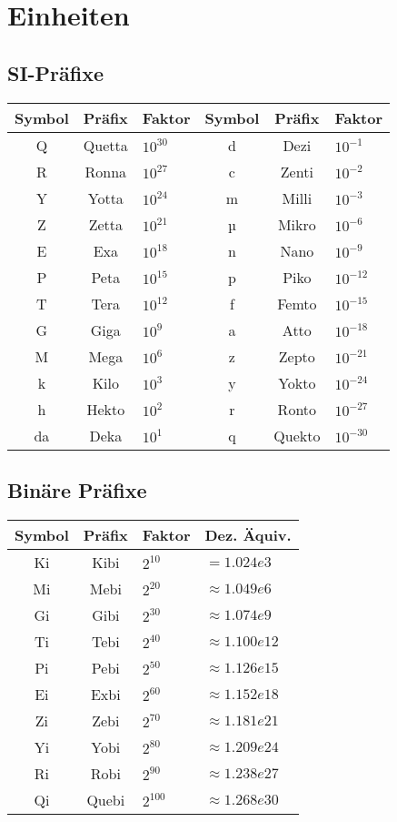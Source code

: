 \section{Einheiten}

\begin{sectionbox}
	\subsection{SI-Präfixe}
		\begin{emphbox}
			\begin{tabular}{ccl|ccl}
				Symbol & Präfix & Faktor & Symbol & Präfix & Faktor \\
				\hline
				Q  & Quetta & $10^{30}$ & d & Dezi & $10^{-1}$\\
				R  & Ronna  & $10^{27}$ & c & Zenti & $10^{-2}$\\
				Y  & Yotta  & $10^{24}$ & m & Milli & $10^{-3}$\\
				Z  & Zetta  & $10^{21}$ & µ & Mikro & $10^{-6}$\\ 
				E  & Exa    & $10^{18}$ & n & Nano  & $10^{-9}$\\
				P  & Peta   & $10^{15}$ & p & Piko  & $10^{-12}$\\
				T  & Tera   & $10^{12}$ & f & Femto  & $10^{-15}$\\
			 	G  & Giga   & $10^9$    & a & Atto   & $10^{-18}$\\
				M  & Mega   & $10^6$    & z & Zepto  & $10^{-21}$\\
				k  & Kilo   & $10^3$    & y & Yokto  & $10^{-24}$\\
				h  & Hekto  & $10^2$    & r & Ronto  & $10^{-27}$\\
				da & Deka   & $10^1$    & q & Quekto & $10^{-30}$\\
			\end{tabular}
		\end{emphbox}

	\subsection{Binäre Präfixe}
		\begin{emphbox}
			\begin{tabular}{ccll}
				Symbol & Präfix & Faktor & Dez. Äquiv. \\
				\hline			
				Ki & Kibi  & $2^{10}$  & $= 1.024e3$ \\
				Mi & Mebi  & $2^{20}$  & $≈ 1.049e6$ \\
				Gi & Gibi  & $2^{30}$  & $≈ 1.074e9$ \\
				Ti & Tebi  & $2^{40}$  & $≈ 1.100e12$ \\
				Pi & Pebi  & $2^{50}$  & $≈ 1.126e15$ \\
				Ei & Exbi  & $2^{60}$  & $≈ 1.152e18$ \\
				Zi & Zebi  & $2^{70}$  & $≈ 1.181e21$ \\
				Yi & Yobi  & $2^{80}$  & $≈ 1.209e24$ \\
				Ri & Robi  & $2^{90}$  & $≈ 1.238e27$ \\
				Qi & Quebi & $2^{100}$ & $≈ 1.268e30$ \\


\end{tabular}
\end{emphbox}
\end{sectionbox}
